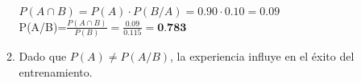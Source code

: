 \documentclass[12pt,letterpaper]{article}
\begin{document}
\begin{enumerate}
\begin{enumerate}
                    $P(A \cap B)= P(A) \cdot P(B/A) = 0.90\cdot0.10=0.09$ \\

                    P(A/B)=$\frac{P(A \cap B)}{P(B)}=\frac{0.09}{0.115}=\textbf{0.783}$\\

                \item
                    Dado que $P(A) \neq P(A/B)$, la experiencia influye en el éxito del entrenamiento.
            \end{enumerate}

\end{enumerate}
\end{document}
